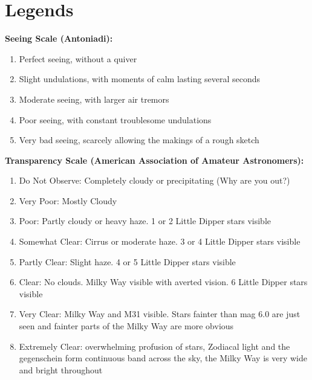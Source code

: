 \section{Legends}

\noindent 

\bigskip 
{\bf Seeing Scale (Antoniadi):}
\begin{enumerate}
\item Perfect seeing, without a quiver
\item Slight undulations, with moments of calm lasting several seconds
\item Moderate seeing, with larger air tremors
\item Poor seeing, with constant troublesome undulations
\item Very bad seeing, scarcely allowing the makings of a rough sketch
\end{enumerate}

\bigskip     
{\bf Transparency Scale (American Association of Amateur Astronomers):}
\begin{enumerate}
\item Do Not Observe: Completely cloudy or precipitating (Why are you out?)
\item Very Poor: Mostly Cloudy
\item Poor: Partly cloudy or heavy haze. 1 or 2 Little Dipper stars visible
\item Somewhat Clear: Cirrus or moderate haze. 3 or 4 Little Dipper stars visible
\item Partly Clear: Slight haze. 4 or 5 Little Dipper stars visible
\item Clear: No clouds. Milky Way visible with averted vision. 6 Little Dipper stars visible
\item Very Clear: Milky Way and M31 visible. Stars fainter than mag 6.0 are just seen and fainter parts of the Milky Way are more obvious 
\item Extremely Clear: overwhelming profusion of stars, Zodiacal light and the gegenschein form continuous band across the sky, the Milky Way is very wide and bright throughout
\end{enumerate}

